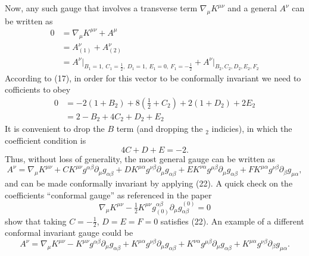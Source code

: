 \documentclass[10pt,letterpaper]{article}
\begin{document}
Now, any such gauge that involves a transverse term $\nabla_\mu K^{\mu\nu}$ and a general $A^\nu$ can be written as
\begin{align}
	0&=\nabla_\mu K^{\mu\nu} + A^\mu\nonumber \\
& = A_{(1)}^\nu + A_{(2)}^\nu\nonumber \\
&= A^{\nu}\bigg|_{B_1=1,\ C_1=\tfrac12,\ D_1=1,\ E_1=0,\ F_1 = -\tfrac12} + A^\nu \bigg|_{B_2,C_2,D_2,E_2,F_2}
\end{align}
According to (17), in order for this vector to be conformally invariant we need to cofficients to obey
\begin{align}
	0&=	-2(1+B_2) + 8 (\tfrac12+C_2) + 2(1+D_2) + 2E_2\nonumber \\
	&= 2-B_2 + 4C_2 + D_2 + E_2
\end{align}
It is convenient to drop the $B$ term (and dropping the ${}_2$ indicies), in which the coefficient condition is
\begin{equation}
4C + D + E = -2.
\end{equation}
Thus, without loss of generality, the most general gauge can be written as
\begin{equation}
	A^\nu  =\nabla_\mu K^{\mu\nu}+ CK^{\mu\nu} g^{\alpha\beta}\partial_\mu g_{\alpha\beta} +D K^{\mu\alpha}g^{\nu\beta}\partial_{\mu}g_{\alpha\beta}+EK^{\nu\alpha}g^{\mu\beta}\partial_\mu g_{\alpha\beta}+FK^{\mu\alpha}g^{\nu\beta}\partial_\beta g_{\mu\alpha},
\end{equation}
and can be made conformally invariant by applying (22). 
A quick check on the coefficients ``conformal gauge'' as referenced in the paper
\begin{equation}
   \nabla_\mu  K^{\mu\nu}- \tfrac12 K^{\mu\nu}  g_{(0)}^{\alpha\beta}\partial_\mu g^{(0)}_{\alpha\beta}=0
\end{equation}
show that taking $C=-\tfrac12$, $D=E=F=0$ satisfies (22). An example of a different conformal invariant gauge could be
\begin{equation}
	A^\nu  =\nabla_\mu K^{\mu\nu} -K^{\mu\nu} g^{\alpha\beta}\partial_\mu g_{\alpha\beta} + K^{\mu\alpha}g^{\nu\beta}\partial_{\mu}g_{\alpha\beta}+K^{\nu\alpha}g^{\mu\beta}\partial_\mu g_{\alpha\beta}+K^{\mu\alpha}g^{\nu\beta}\partial_\beta g_{\mu\alpha}.
\end{equation}
\\
\end{document}
